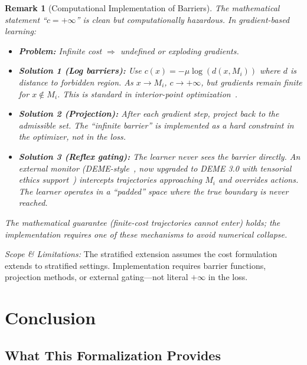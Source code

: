 \documentclass[12pt]{article}
\newtheorem{remark}[theorem]{Remark}
\begin{document}
\begin{remark}[Computational Implementation of Barriers]
\emph{The mathematical statement ``$c = +\infty$''
is clean but computationally hazardous. In gradient-based learning:}
\begin{itemize}
\item \emph{\textbf{Problem:} Infinite cost $\Rightarrow$ undefined or exploding gradients.}
\item \emph{\textbf{Solution 1 (Log barriers):} Use $c(x) = -\mu \log(d(x, M_i))$ where $d$ is distance to forbidden
region. As $x \to M_i$, $c \to +\infty$, but gradients remain finite for $x \notin M_i$. This is standard in
interior-point optimization~\cite{nesterov1994,boyd2004}.}
\item \emph{\textbf{Solution 2 (Projection):} After each gradient step, project back to the admissible set. The
``infinite barrier'' is implemented as a hard constraint in the optimizer, not in the loss.}
\item \emph{\textbf{Solution 3 (Reflex gating):} The learner never sees the barrier directly. An external
monitor (DEME-style~\cite{bond2025deme}, now upgraded to DEME 3.0 with tensorial ethics support~\cite{bond2026erisml}) intercepts trajectories approaching $M_i$ and overrides actions. The
learner operates in a ``padded'' space where the true boundary is never reached.}
\end{itemize}

\emph{The mathematical guarantee (finite-cost trajectories cannot enter) holds; the implementation requires one of these mechanisms to avoid numerical collapse.}
\end{remark}

\emph{Scope \& Limitations:} The stratified extension assumes the cost formulation extends to stratified
settings. Implementation requires barrier functions, projection methods, or external gating---not
literal $+\infty$ in the loss.

\section{Conclusion}

\subsection{What This Formalization Provides}
\end{document}
